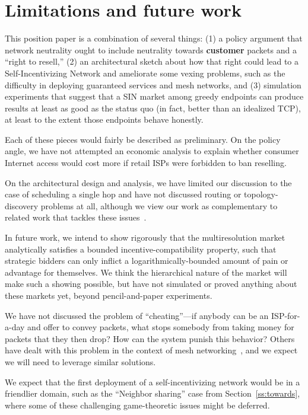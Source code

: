 \section{Limitations and future work}
\label{sec:limits}

This position paper is a combination of several things: (1) a policy
argument that network neutrality ought to include neutrality towards
\textbf{customer} packets and a ``right to resell,'' (2) an
architectural sketch about how that right could lead to a
Self-Incentivizing Network and ameliorate some vexing problems, such
as the difficulty in deploying guaranteed services and mesh networks,
and (3) simulation experiments that suggest that a SIN market among
greedy endpoints can produce results at least as good as the status
quo (in fact, better than an idealized TCP), at least to the extent
those endpoints behave honestly.

Each of these pieces would fairly be described as preliminary. On the
policy angle, we have not attempted an economic analysis to explain
whether consumer Internet access would cost more if retail ISPs were
forbidden to ban reselling.

On the architectural design and analysis, we have limited our
discussion to the case of scheduling a single hop and have not
discussed routing or topology-discovery problems at all, although we
view our work as complementary to related work that tackles these
issues~\cite{routebazaar15, esquivel09}.

In future work, we intend to show rigorously that the multiresolution
market analytically satisfies a bounded incentive-compatibility
property, such that strategic bidders can only inflict a
logarithmically-bounded amount of pain or advantage for themselves. We
think the hierarchical nature of the market will make such a showing
possible, but have not simulated or proved anything about these
markets yet, beyond pencil-and-paper experiments.

We have not discussed the problem of ``cheating''---if anybody can be
an ISP-for-a-day and offer to convey packets, what stops somebody from
taking money for packets that they then drop? How can the system
punish this behavior? Others have dealt with this problem in the
context of mesh networking~\cite{onions14, torpath14, kadupul15}, and
we expect we will need to leverage similar solutions.

We expect that the first deployment of a self-incentivizing network
would be in a friendlier domain, such as the ``Neighbor
sharing'' case from Section~\ref{ss:towards}, where some of these
challenging game-theoretic issues might be deferred.
